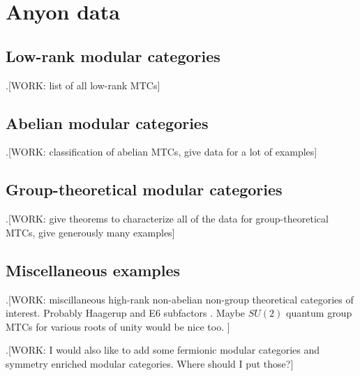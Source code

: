 \section{Anyon data}

\subsection{Low-rank modular categories}

.[WORK: list of all low-rank MTCs]

\subsection{Abelian modular categories}

.[WORK: classification of abelian MTCs, give data for a lot of examples]

\subsection{Group-theoretical modular categories}

.[WORK: give theorems to characterize all of the data for group-theoretical MTCs, give generously many examples]

\subsection{Miscellaneous examples}

.[WORK: miscillaneous high-rank non-abelian non-group theoretical categories of interest. Probably Haagerup and E6 subfactors \cite{hong2008exotic}. Maybe $SU(2)$ quantum group MTCs for various roots of unity would be nice too.
]

.[WORK: I would also like to add some fermionic modular categories and symmetry enriched modular categories. Where should I put those?]